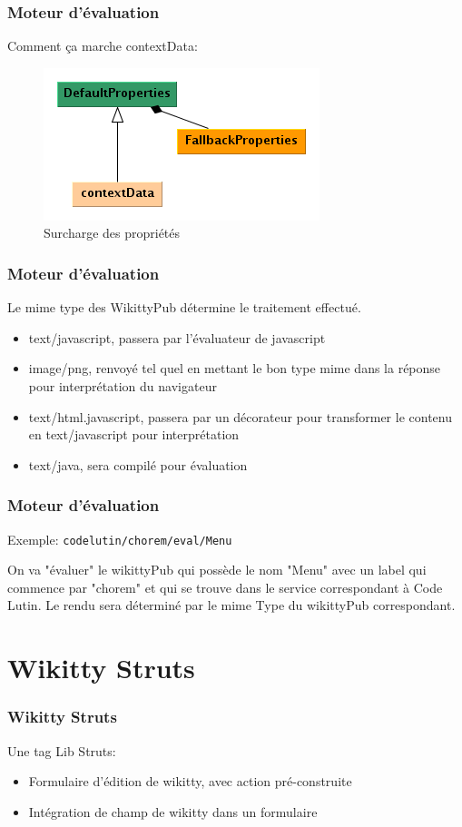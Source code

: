 \documentclass[12pt,a4paper,utf8x]{beamer}
\begin{document}
\begin{frame}\frametitle{Moteur d'évaluation}

Comment ça marche contextData:
\begin{figure}
\includegraphics[scale=0.5]{../image/propertiescontext.png} 
\caption{Surcharge des propriétés}
\end{figure}

\end{frame}

\begin{frame}\frametitle{Moteur d'évaluation}
Le mime type des WikittyPub détermine le traitement effectué.
\begin{itemize}
\item text/javascript, passera par l'évaluateur de javascript
\item image/png, renvoyé tel quel en mettant le bon type mime dans la réponse 
pour interprétation du navigateur
\item text/html.javascript, passera par un décorateur pour transformer le contenu
en text/javascript pour interprétation
\item text/java, sera compilé pour évaluation
\end{itemize}
\end{frame}

\begin{frame}\frametitle{Moteur d'évaluation}

Exemple:
\verb!codelutin/chorem/eval/Menu! 

On va "évaluer" le wikittyPub qui possède le nom "Menu" avec un label qui
commence par "chorem" et qui se trouve dans le service correspondant à Code Lutin.
Le rendu sera déterminé par le mime Type du wikittyPub correspondant.
\end{frame}





\section{Wikitty Struts} 
\begin{frame}\frametitle{Wikitty Struts}
Une tag Lib Struts:
\begin{itemize}
\item Formulaire d'édition de wikitty, avec action pré-construite 
\item Intégration de champ de wikitty dans un formulaire
\end{itemize}

\end{frame}
\end{document}
